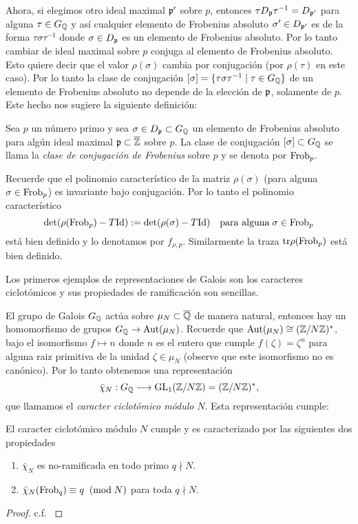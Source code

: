 Ahora, si elegimos otro ideal maximal $\mathfrak{p}'$ sobre $p$, entonces $\tau D_{\mathfrak{p}}\tau^{-1}=D_{\mathfrak{p}'}$ para alguna $\tau\in G_{\mathbb{Q}}$ y as\'i cualquier elemento de Frobenius absoluto $\sigma'\in D_{\mathfrak{p}'}$ es de la forma $\tau\sigma\tau^{-1}$ donde $\sigma\in D_{\mathfrak{p}}$ es un elemento de Frobenius absoluto. Por lo tanto cambiar de ideal maximal sobre $p$ conjuga al elemento de Frobenius absoluto. Esto quiere decir que el valor $\rho(\sigma)$ cambia por conjugaci\'on (por $\rho(\tau)$ en este caso). Por lo tanto la clase de conjugaci\'on $[\sigma]=\{\tau\sigma\tau^{-1}\mid\tau\in G_{\mathbb{Q}}\}$ de un elemento de Frobenius absoluto no depende de la elecci\'on de $\mathfrak{p}$, solamente de $p$. Este hecho nos sugiere la siguiente definici\'on:

\begin{defin}
  Sea $p$ un n\'umero primo y sea $\sigma\in D_{\mathfrak{p}}\subset G_{\mathbb{Q}}$ un elemento de Frobenius absoluto para alg\'un ideal maximal $\mathfrak{p}\subset\overline{\mathbb{Z}}$ sobre $p$. La clase de conjugaci\'on $[\sigma]\subset G_{\mathbb{Q}}$ se llama la \emph{clase de conjugaci\'on de Frobenius} sobre $p$ y se denota por $\mathrm{Frob}_p$.
\end{defin}

Recuerde que el polinomio caracter\'istico de la matriz $\rho(\sigma)$ (para alguna $\sigma\in\mathrm{Frob}_p$) es invariante bajo conjugaci\'on. Por lo tanto el polinomio caracter\'istico
\[
  \det(\rho(\mathrm{Frob}_p)-T\mathrm{Id}):=\det(\rho(\sigma)-T\mathrm{Id})
  \quad\text{para alguna}\;\sigma\in\mathrm{Frob}_p
\]
est\'a bien definido y lo denotamos por $f_{\rho,p}$. Similarmente la traza $\mathrm{tr}\rho(\mathrm{Frob}_p)$ est\'a bien definido.

Los primeros ejemplos de representaciones de Galois son los caracteres ciclot\'omicos y sus propiedades de ramificaci\'on son sencillas.

El grupo de Galois $G_{\mathbb{Q}}$ act\'ua sobre $\mu_N\subset\overline{\mathbb{Q}}$ de manera natural,
entonces hay un homomorfismo de grupos $G_{\mathbb{Q}}\rightarrow\text{Aut}(\mu_N)$. Recuerde que $\text{Aut}(\mu_N)\cong(\mathbb{Z}/N\mathbb{Z})^*$, bajo el isomorfismo $f\mapsto n$ donde $n$ es el entero que cumple $f(\zeta)=\zeta^n$ para alguna raiz primitiva de la unidad $\zeta\in\mu_N$ (observe que este isomorfismo no es can\'onico). Por lo tanto obtenemos una representaci\'on
\[
  \bar{\chi}_N:G_{\mathbb{Q}}\longrightarrow\mathrm{GL}_1(\mathbb{Z}/N\mathbb{Z})=(\mathbb{Z}/N\mathbb{Z})^*,
\]
que llamamos el \emph{caracter ciclot\'omico m\'odulo} $N$. Esta representaci\'on cumple:
\begin{prop}\label{prop:car_ciclo_modN} El caracter ciclot\'omico m\'odulo $N$ cumple y es caracterizado por las siguientes dos propiedades
\begin{enumerate}[label=\roman*)]
  \item $\bar{\chi}_N$ es no-ramificada en todo primo $q\nmid N$.
  \item $\bar{\chi}_N(\mathrm{Frob}_q)\equiv q\;\;(\mathrm{mod}\; N)$ para toda $q\nmid N$.
\end{enumerate}
\end{prop}
\begin{proof}
  c.f. \cite[\S5.2 proposici\'on 5.12 y \S8.1 teorema 8.7]{SaitoNumberTheory2}
\end{proof}


